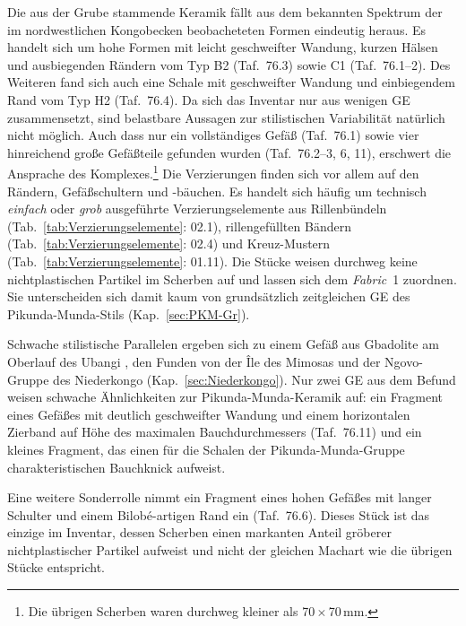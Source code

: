\vspace{1em}
\noindent Die aus der Grube stammende Keramik fällt aus dem bekannten Spektrum der im nordwestlichen Kongobecken beobacheteten Formen eindeutig heraus. Es handelt sich um hohe Formen mit leicht geschweifter Wandung, kurzen Hälsen und ausbiegenden Rändern vom Typ B2 (Taf.~76.3) sowie C1 (Taf.~76.1--2). Des Weiteren fand sich auch eine Schale mit geschweifter Wandung und einbiegendem Rand vom Typ H2 (Taf.~76.4). Da sich das Inventar nur aus wenigen GE zusammensetzt, sind belastbare Aussagen zur stilistischen Variabilität natürlich nicht möglich. Auch dass nur ein vollständiges Gefäß (Taf.~76.1) sowie vier hinreichend große Gefäßteile gefunden wurden (Taf.~76.2--3, 6, 11), erschwert die Ansprache des Komplexes.\footnote{Die übrigen Scherben waren durchweg kleiner als 70\,$\times$\,70\,mm.} Die Verzierungen finden sich vor allem auf den Rändern, Gefäßschultern und \mbox{-bäuchen}. Es handelt sich häufig um technisch \textit{einfach} oder \textit{grob} ausgeführte Verzierungselemente aus Rillenbündeln (Tab.~\ref{tab:Verzierungselemente}: 02.1), rillengefüllten Bändern (Tab.~\ref{tab:Verzierungselemente}: 02.4) und Kreuz-Mustern (Tab.~\ref{tab:Verzierungselemente}: 01.11). Die Stücke weisen durchweg keine nichtplastischen Partikel im Scherben auf und lassen sich dem \textit{Fabric}~1 zuordnen. Sie unterscheiden sich damit kaum von grundsätzlich zeitgleichen GE des Pikunda-Munda-Stils (Kap.~\ref{sec:PKM-Gr}).

Schwache stilistische Parallelen ergeben sich zu einem Gefäß aus Gbadolite am Oberlauf des \mbox{Ubangi} \parencite[277; 278 Abb. 7]{Eggert.1984}, den Funden von der Île des Mimosas \parencite[279 Abb. 8]{Eggert.1984} und der Ngovo-Gruppe des Niederkongo (Kap.~\ref{sec:Niederkongo}). Nur zwei GE aus dem Befund weisen schwache Ähnlichkeiten zur Pikunda-Munda-Keramik auf: ein Fragment eines Gefäßes mit deutlich geschweifter Wandung und einem horizontalen Zierband auf Höhe des maximalen Bauchdurchmessers (Taf.~76.11) und ein kleines Fragment, das einen für die Schalen der Pikunda-Munda-Gruppe charakteristischen Bauchknick aufweist.\linebreak

Eine weitere Sonderrolle nimmt ein Fragment eines hohen Gefäßes mit langer Schulter und einem Bilobé-artigen Rand ein (Taf.~76.6). Dieses Stück ist das einzige im Inventar, dessen Scherben einen markanten Anteil gröberer nichtplastischer Partikel aufweist und nicht der gleichen Machart wie die übrigen Stücke entspricht.

